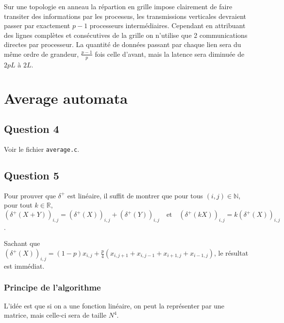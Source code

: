 \documentclass{article}
\begin{document}
Sur une topologie en anneau la répartion en grille impose clairement de faire transiter des informations par les processus, les transmissions verticales devraient passer par exactement $p-1$ processeurs intermédiaires. Cependant en attribuant des lignes complètes et consécutives de la grille on n'utilise que 2 communications directes par processeur. La quantité de données passant par chaque lien sera du même ordre de grandeur, $\frac{p-1}{p}$ fois celle d'avant, mais la latence sera diminuée de $2pL$ à $2L$.

\section{Average automata}

\subsection*{Question 4} 

Voir le fichier \texttt{average.c}.

\subsection*{Question 5}

Pour prouver que $\delta^+$ est linéaire, il suffit de montrer que pour tous $(i,j) \in \mathbb{N}$, pour tout $k \in \mathbb{R}$, 
$$(\delta^+(X+Y))_{i,j} = (\delta^+(X))_{i,j} + (\delta^+(Y))_{i,j} \quad \text{et} \quad (\delta^+(kX))_{i,j} = k(\delta^+(X))_{i,j}$$.

Sachant que $(\delta^+(X))_{i,j} = (1-p)x_{i,j} + \frac{p}{4} \left(x_{i,j+1} + x_{i,j-1} + x_{i+1,j} + x_{i-1,j}\right)$, le résultat est immédiat.

\subsubsection*{Principe de l'algorithme}

L'idée est que si on a une fonction linéaire, on peut la représenter par une matrice, mais celle-ci sera de taille $N^4$.
\end{document}
